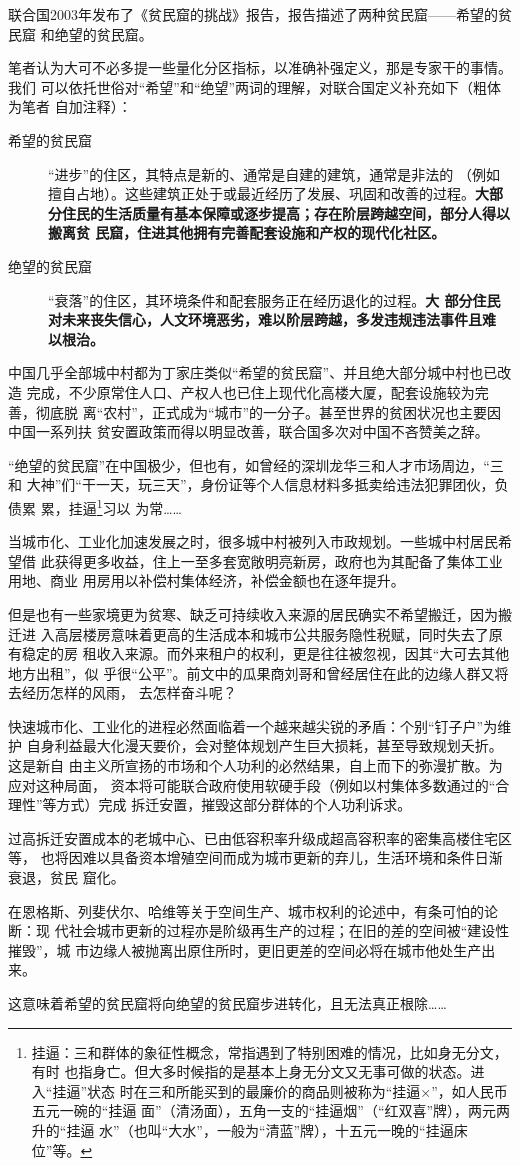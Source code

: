 联合国2003年发布了《贫民窟的挑战》报告，报告描述了两种贫民窟——希望的贫民窟
和绝望的贫民窟。

笔者认为大可不必多提一些量化分区指标，以准确补强定义，那是专家干的事情。我们
可以依托世俗对“希望”和“绝望”两词的理解，对联合国定义补充如下（粗体为笔者
自加注释）：
\begin{description}
\item[希望的贫民窟] “进步”的住区，其特点是新的、通常是自建的建筑，通常是非法的
  （例如擅自占地）。这些建筑正处于或最近经历了发展、巩固和改善的过程。\textbf{大部
    分住民的生活质量有基本保障或逐步提高；存在阶层跨越空间，部分人得以搬离贫
    民窟，住进其他拥有完善配套设施和产权的现代化社区。}

\item[绝望的贫民窟] “衰落”的住区，其环境条件和配套服务正在经历退化的过程。\textbf{大
    部分住民对未来丧失信心，人文环境恶劣，难以阶层跨越，多发违规违法事件且难
    以根治。}
\end{description}

中国几乎全部城中村都为丁家庄类似“希望的贫民窟”、并且绝大部分城中村也已改造
完成，不少原常住人口、产权人也已住上现代化高楼大厦，配套设施较为完善，彻底脱
离“农村”，正式成为“城市”的一分子。甚至世界的贫困状况也主要因中国一系列扶
贫安置政策而得以明显改善，联合国多次对中国不吝赞美之辞。

“绝望的贫民窟”在中国极少，但也有，如曾经的深圳龙华三和人才市场周边，“三和
大神”们“干一天，玩三天”，身份证等个人信息材料多抵卖给违法犯罪团伙，负债累
累，挂逼\footnote{挂逼：三和群体的象征性概念，常指遇到了特别困难的情况，比如身无分文，有时
  也指身亡。但大多时候指的是基本上身无分文又无事可做的状态。进入“挂逼”状态
  时在三和所能买到的最廉价的商品则被称为“挂逼×”，如人民币五元一碗的“挂逼
  面”（清汤面），五角一支的“挂逼烟”（“红双喜”牌），两元两升的“挂逼
  水”（也叫“大水”，一般为“清蓝”牌），十五元一晚的“挂逼床位”等。}习以
为常……


当城市化、工业化加速发展之时，很多城中村被列入市政规划。一些城中村居民希望借
此获得更多收益，住上一至多套宽敞明亮新房，政府也为其配备了集体工业用地、商业
用房用以补偿村集体经济，补偿金额也在逐年提升。


但是也有一些家境更为贫寒、缺乏可持续收入来源的居民确实不希望搬迁，因为搬迁进
入高层楼房意味着更高的生活成本和城市公共服务隐性税赋，同时失去了原有稳定的房
租收入来源。而外来租户的权利，更是往往被忽视，因其“大可去其他地方出租”，似
乎很“公平”。前文中的瓜果商刘哥和曾经居住在此的边缘人群又将去经历怎样的风雨，
去怎样奋斗呢？

快速城市化、工业化的进程必然面临着一个越来越尖锐的矛盾：个别“钉子户”为维护
自身利益最大化漫天要价，会对整体规划产生巨大损耗，甚至导致规划夭折。这是新自
由主义所宣扬的市场和个人功利的必然结果，自上而下的弥漫扩散。为应对这种局面，
资本将可能联合政府使用软硬手段（例如以村集体多数通过的“合理性”等方式）完成
拆迁安置，摧毁这部分群体的个人功利诉求。

过高拆迁安置成本的老城中心、已由低容积率升级成超高容积率的密集高楼住宅区等，
也将因难以具备资本增殖空间而成为城市更新的弃儿，生活环境和条件日渐衰退，贫民
窟化。


在恩格斯、列斐伏尔、哈维等关于空间生产、城市权利的论述中，有条可怕的论断：现
代社会城市更新的过程亦是阶级再生产的过程；在旧的差的空间被“建设性摧毁”，城
市边缘人被抛离出原住所时，更旧更差的空间必将在城市他处生产出来。


这意味着希望的贫民窟将向绝望的贫民窟步进转化，且无法真正根除……
